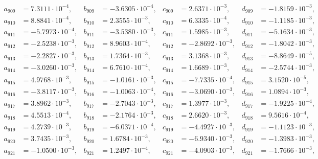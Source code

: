 \begin{align*}
  a_{ 909 } &= 7.3111 \cdot 10^{ -4 }, & b_{ 909 } &= -3.6305 \cdot 10^{ -4 }, & c_{ 909 } &= 2.6371 \cdot 10^{ -3 }, & d_{ 909 } &= -1.8159 \cdot 10^{ -3 }, \\ 
  a_{ 910 } &= 8.8841 \cdot 10^{ -4 }, & b_{ 910 } &= 2.3555 \cdot 10^{ -3 }, & c_{ 910 } &= 6.3335 \cdot 10^{ -4 }, & d_{ 910 } &= -1.1185 \cdot 10^{ -3 }, \\ 
  a_{ 911 } &= -5.7973 \cdot 10^{ -4 }, & b_{ 911 } &= -3.5380 \cdot 10^{ -3 }, & c_{ 911 } &= 1.5985 \cdot 10^{ -3 }, & d_{ 911 } &= -5.1634 \cdot 10^{ -3 }, \\ 
  a_{ 912 } &= -2.5238 \cdot 10^{ -3 }, & b_{ 912 } &= 8.9603 \cdot 10^{ -4 }, & c_{ 912 } &= -2.8692 \cdot 10^{ -3 }, & d_{ 912 } &= -1.8042 \cdot 10^{ -3 }, \\ 
  a_{ 913 } &= -2.2827 \cdot 10^{ -3 }, & b_{ 913 } &= 1.7364 \cdot 10^{ -3 }, & c_{ 913 } &= 3.1368 \cdot 10^{ -3 }, & d_{ 913 } &= -8.8649 \cdot 10^{ -5 }, \\ 
  a_{ 914 } &= -3.0260 \cdot 10^{ -3 }, & b_{ 914 } &= 6.7610 \cdot 10^{ -4 }, & c_{ 914 } &= 1.6689 \cdot 10^{ -3 }, & d_{ 914 } &= -2.5744 \cdot 10^{ -3 }, \\ 
  a_{ 915 } &= 4.9768 \cdot 10^{ -3 }, & b_{ 915 } &= -1.0161 \cdot 10^{ -3 }, & c_{ 915 } &= -7.7335 \cdot 10^{ -4 }, & d_{ 915 } &= 3.1520 \cdot 10^{ -5 }, \\ 
  a_{ 916 } &= -3.8117 \cdot 10^{ -3 }, & b_{ 916 } &= -1.0063 \cdot 10^{ -4 }, & c_{ 916 } &= -3.0690 \cdot 10^{ -3 }, & d_{ 916 } &= 1.0894 \cdot 10^{ -3 }, \\ 
  a_{ 917 } &= 3.8962 \cdot 10^{ -3 }, & b_{ 917 } &= -2.7043 \cdot 10^{ -3 }, & c_{ 917 } &= 1.3977 \cdot 10^{ -3 }, & d_{ 917 } &= -1.9225 \cdot 10^{ -4 }, \\ 
  a_{ 918 } &= 4.5513 \cdot 10^{ -4 }, & b_{ 918 } &= -2.1764 \cdot 10^{ -3 }, & c_{ 918 } &= 2.6620 \cdot 10^{ -3 }, & d_{ 918 } &= 9.5616 \cdot 10^{ -4 }, \\ 
  a_{ 919 } &= 4.2739 \cdot 10^{ -3 }, & b_{ 919 } &= -6.0371 \cdot 10^{ -4 }, & c_{ 919 } &= -4.4927 \cdot 10^{ -3 }, & d_{ 919 } &= -1.1123 \cdot 10^{ -3 }, \\ 
  a_{ 920 } &= 3.7435 \cdot 10^{ -3 }, & b_{ 920 } &= 1.6784 \cdot 10^{ -3 }, & c_{ 920 } &= -6.9340 \cdot 10^{ -3 }, & d_{ 920 } &= -1.3983 \cdot 10^{ -3 }, \\ 
  a_{ 921 } &= -1.0500 \cdot 10^{ -3 }, & b_{ 921 } &= 1.2497 \cdot 10^{ -4 }, & c_{ 921 } &= -4.0903 \cdot 10^{ -3 }, & d_{ 921 } &= -1.7666 \cdot 10^{ -3 }, \\ 

\end{align*}
